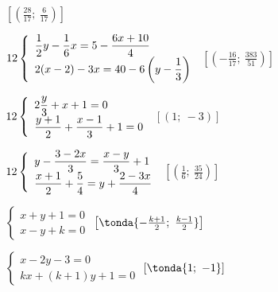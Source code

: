 \begin{esercizio}[*]
\begin{htmulticols}{2}
\begin{enumeratea}
 \hfill \(\left[\left(\frac{28}{17};~\frac{6}{17}\right)\right]\)
\item \(\arraystretch{2}\left\{\begin{array}{l}
\dfrac{1}{2}y-\dfrac{1}{6}x=5-\dfrac{6x+10}{4}\\
2(x-2)-3x=40-6\left(y-\dfrac{1}{3}\right)\end{array}\right.\)
 \hfill \(\left[\left(-\frac{16}{17};~\frac{383}{51}\right)\right]\)
\item \(\arraystretch{2}\left\{\begin{array}{l}
2\dfrac{y}{3}+x+1=0\\
\dfrac{y+1}{2}+\dfrac{x-1}{3}+1=0\end{array}\right.\)
 \hfill \(\left[(1;~-3)\right]\)
\item \(\arraystretch{2}\left\{\begin{array}{l}
y-\dfrac{3-2x}{3}=\dfrac{x-y}{3}+1\\
\dfrac{x+1}{2}+\dfrac{5}{4}=y+\dfrac{2-3x}{4}\end{array}\right.\)
 \hfill \(\left[\left(\frac{1}{6};~\frac{35}{24}\right)\right]\)
  \item \(\left\{\begin{array}{l}
  x+y+1=0 \\
  x-y+k=0 \end{array}\right.\)
 \hfill \(\left[\tonda{-\frac{k+1}{2};~\frac{k-1}{2}}\right]\)
\item \(\left\{\begin{array}{l}
x-2y-3=0\\
kx+(k+1)y+1=0 \end{array}\right.\)
 \hfill \(\left[\tonda{1;~-1}\right]\)
 \end{enumeratea}
 \end{htmulticols}
\end{esercizio}


